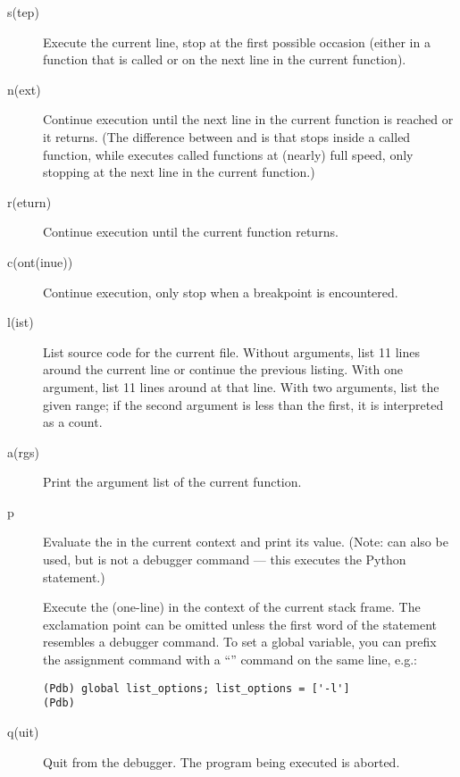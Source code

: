 \begin{description}
\item[s(tep)]

Execute the current line, stop at the first possible occasion
(either in a function that is called or on the next line in the
current function).

\item[n(ext)]

Continue execution until the next line in the current function
is reached or it returns.  (The difference between  and
 is that  stops inside a called function, while
 executes called functions at (nearly) full speed, only
stopping at the next line in the current function.)

\item[r(eturn)]

Continue execution until the current function returns.

\item[c(ont(inue))]

Continue execution, only stop when a breakpoint is encountered.

\item[l(ist) ]

List source code for the current file.  Without arguments, list 11
lines around the current line or continue the previous listing.  With
one argument, list 11 lines around at that line.  With two arguments,
list the given range; if the second argument is less than the first,
it is interpreted as a count.

\item[a(rgs)]

Print the argument list of the current function.

\item[p ]

Evaluate the  in the current context and print its
value.  (Note:  can also be used, but is not a debugger
command --- this executes the Python  statement.)

\item[\optional{!}]

Execute the (one-line)  in the context of
the current stack frame.
The exclamation point can be omitted unless the first word
of the statement resembles a debugger command.
To set a global variable, you can prefix the assignment
command with a ``'' command on the same line, e.g.:
\begin{verbatim}
(Pdb) global list_options; list_options = ['-l']
(Pdb)
\end{verbatim}
%
\item[q(uit)]

Quit from the debugger.
The program being executed is aborted.

\end{description}

